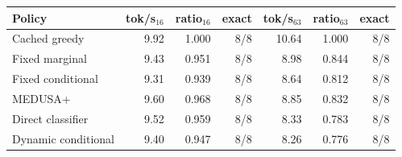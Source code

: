 \begin{center}
\begin{tabular}{lrrrrrr}
\toprule
Policy & tok/s$_{16}$ & ratio$_{16}$ & exact & tok/s$_{63}$ & ratio$_{63}$ & exact\\
\midrule
Cached greedy & 9.92 & 1.000 & 8/8 & 10.64 & 1.000 & 8/8\\
Fixed marginal & 9.43 & 0.951 & 8/8 & 8.98 & 0.844 & 8/8\\
Fixed conditional & 9.31 & 0.939 & 8/8 & 8.64 & 0.812 & 8/8\\
MEDUSA+ & 9.60 & 0.968 & 8/8 & 8.85 & 0.832 & 8/8\\
Direct classifier & 9.52 & 0.959 & 8/8 & 8.33 & 0.783 & 8/8\\
Dynamic conditional & 9.40 & 0.947 & 8/8 & 8.26 & 0.776 & 8/8\\
\bottomrule
\end{tabular}
\end{center}
